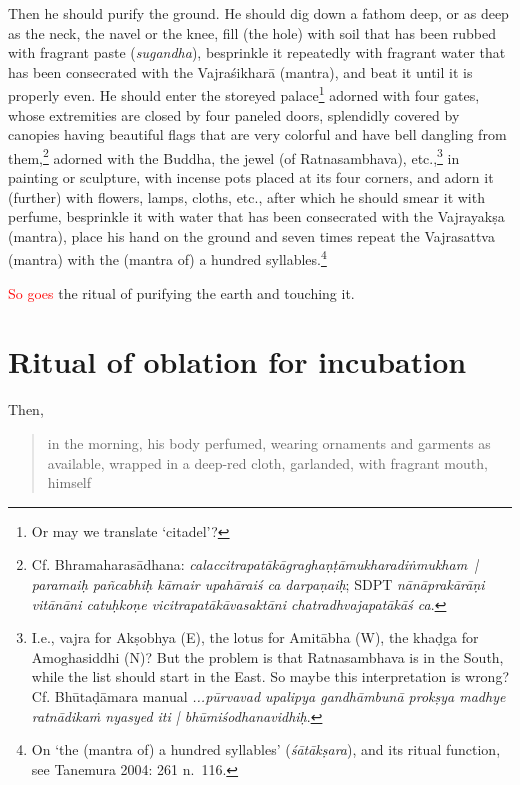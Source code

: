 \documentclass[11pt]{book}
\newcommand{\red}[1]{\textcolor{red}{#1}}
\newcommand{\skt}[1]{\emph{#1}}
\begin{document}
Then he should purify the ground. He should dig down a fathom deep, or as deep as the neck, the navel or the knee, fill (the hole) with soil that has been rubbed with fragrant paste (\skt{sugandha}), besprinkle it repeatedly with fragrant water that has been consecrated with the Vajraśikharā (mantra), and beat it until it is properly even. He should enter the storeyed palace\footnote{Or may we translate `citadel'?} adorned with four gates, whose extremities are closed by four paneled doors, splendidly covered by canopies
having beautiful flags that are very colorful and have bell dangling from them,\footnote{Cf. Bhramaharasādhana: \skt{calaccitrapatākāgraghaṇṭāmukharadiṅmukham~|  paramaiḥ pañcabhiḥ kāmair upahāraiś ca darpaṇaiḥ}; SDPT \skt{nānāprakārāṇi vitānāni catuḥkoṇe vicitrapatākāvasaktāni chatradhvajapatākāś ca}.} adorned with the Buddha, the jewel (of Ratnasambhava), etc.,\footnote{I.e., vajra for Akṣobhya (E), the lotus for Amitābha (W), the khaḍga for Amoghasiddhi (N)? But the problem is that Ratnasambhava is in the South, while the list should start in the East. So maybe this interpretation is wrong?
Cf. Bhūtaḍāmara manual  \skt{...pūrvavad upalipya gandhāmbunā prokṣya madhye ratnādikaṁ nyasyed iti | bhūmiśodhanavidhiḥ}.} in painting or sculpture, with incense pots placed at its four corners, and adorn it (further) with flowers, lamps, cloths, etc., after which he should smear it with perfume, besprinkle it with water that has been consecrated with the Vajrayakṣa (mantra), place his hand on the ground and seven times repeat the Vajrasattva (mantra) with the (mantra of) a hundred syllables.\footnote{On `the (mantra of) a hundred syllables' (\skt{śātākṣara}), and its ritual function, see Tanemura 2004: 261 n.~116.}

\red{So goes} the ritual of purifying the earth and touching it.

\section{Ritual of oblation for incubation}
Then, 

\begin{verse}
in the morning, his body perfumed, wearing ornaments and garments as available, wrapped in a deep-red cloth, garlanded, with fragrant mouth, himself
\end{verse}
\end{document}
